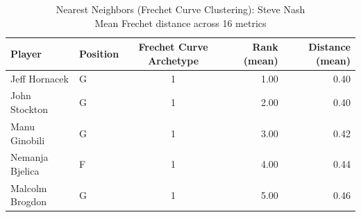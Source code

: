 \begin{table}[t]
\caption*{
{\fontsize{20}{25} Nearest Neighbors (Frechet Curve Clustering): Steve Nash\fontsize{12}{15}\selectfont } \\ 
{\fontsize{14}{17}\selectfont  Mean Frechet distance across 16 metrics\fontsize{12}{15}\selectfont }
} 
\fontsize{12.0pt}{14.0pt}\selectfont
\begin{tabular*}{\linewidth}{@{\extracolsep{\fill}}llcrr}
\toprule
Player & Position & Frechet Curve Archetype & Rank (mean) & Distance (mean) \\ 
\midrule\addlinespace[2.5pt]
Jeff Hornacek & G & 1 & 1.00 & 0.40 \\ 
John Stockton & G & 1 & 2.00 & 0.40 \\ 
Manu Ginobili & G & 1 & 3.00 & 0.42 \\ 
Nemanja Bjelica & F & 1 & 4.00 & 0.44 \\ 
Malcolm Brogdon & G & 1 & 5.00 & 0.46 \\ 
\bottomrule
\end{tabular*}
\end{table}

